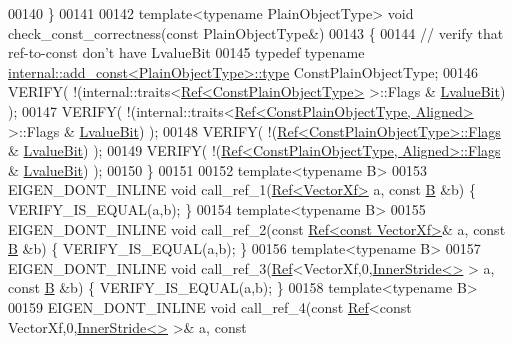 \begin{DoxyCode}
00140 \}
00141 
00142 \textcolor{keyword}{template}<\textcolor{keyword}{typename} PlainObjectType> \textcolor{keywordtype}{void} check\_const\_correctness(\textcolor{keyword}{const} PlainObjectType&)
00143 \{
00144   \textcolor{comment}{// verify that ref-to-const don't have LvalueBit}
00145   \textcolor{keyword}{typedef} \textcolor{keyword}{typename} \hyperlink{group___core___module_class_eigen_1_1_transpose}{internal::add\_const<PlainObjectType>::type} 
      ConstPlainObjectType;
00146   VERIFY( !(internal::traits<\hyperlink{group___core___module_class_eigen_1_1_ref}{Ref<ConstPlainObjectType>} >::Flags & 
      \hyperlink{group__flags_gae2c323957f20dfdc6cb8f44428eaec1a}{LvalueBit}) );
00147   VERIFY( !(internal::traits<\hyperlink{group___core___module_class_eigen_1_1_ref}{Ref<ConstPlainObjectType, Aligned>} >::Flags 
      & \hyperlink{group__flags_gae2c323957f20dfdc6cb8f44428eaec1a}{LvalueBit}) );
00148   VERIFY( !(\hyperlink{group___core___module_class_eigen_1_1_ref}{Ref<ConstPlainObjectType>::Flags} & 
      \hyperlink{group__flags_gae2c323957f20dfdc6cb8f44428eaec1a}{LvalueBit}) );
00149   VERIFY( !(\hyperlink{group___core___module_class_eigen_1_1_ref}{Ref<ConstPlainObjectType, Aligned>::Flags} & 
      \hyperlink{group__flags_gae2c323957f20dfdc6cb8f44428eaec1a}{LvalueBit}) );
00150 \}
00151 
00152 \textcolor{keyword}{template}<\textcolor{keyword}{typename} B>
00153 EIGEN\_DONT\_INLINE \textcolor{keywordtype}{void} call\_ref\_1(\hyperlink{group___core___module_class_eigen_1_1_ref}{Ref<VectorXf>} a, \textcolor{keyword}{const} \hyperlink{group___core___module_class_eigen_1_1_matrix}{B} &b) \{ VERIFY\_IS\_EQUAL(a,b); \}
00154 \textcolor{keyword}{template}<\textcolor{keyword}{typename} B>
00155 EIGEN\_DONT\_INLINE \textcolor{keywordtype}{void} call\_ref\_2(\textcolor{keyword}{const} \hyperlink{group___core___module_class_eigen_1_1_ref}{Ref<const VectorXf>}& a, \textcolor{keyword}{const} 
      \hyperlink{group___core___module_class_eigen_1_1_matrix}{B} &b) \{ VERIFY\_IS\_EQUAL(a,b); \}
00156 \textcolor{keyword}{template}<\textcolor{keyword}{typename} B>
00157 EIGEN\_DONT\_INLINE \textcolor{keywordtype}{void} call\_ref\_3(\hyperlink{group___core___module_class_eigen_1_1_ref}{Ref}<VectorXf,0,\hyperlink{class_eigen_1_1_inner_stride}{InnerStride<>} > a, \textcolor{keyword}{const} 
      \hyperlink{group___core___module_class_eigen_1_1_matrix}{B} &b) \{ VERIFY\_IS\_EQUAL(a,b); \}
00158 \textcolor{keyword}{template}<\textcolor{keyword}{typename} B>
00159 EIGEN\_DONT\_INLINE \textcolor{keywordtype}{void} call\_ref\_4(\textcolor{keyword}{const} \hyperlink{group___core___module_class_eigen_1_1_ref}{Ref}<\textcolor{keyword}{const} VectorXf,0,\hyperlink{class_eigen_1_1_inner_stride}{InnerStride<>} >& a, \textcolor{keyword}{const} 

\end{DoxyCode}
